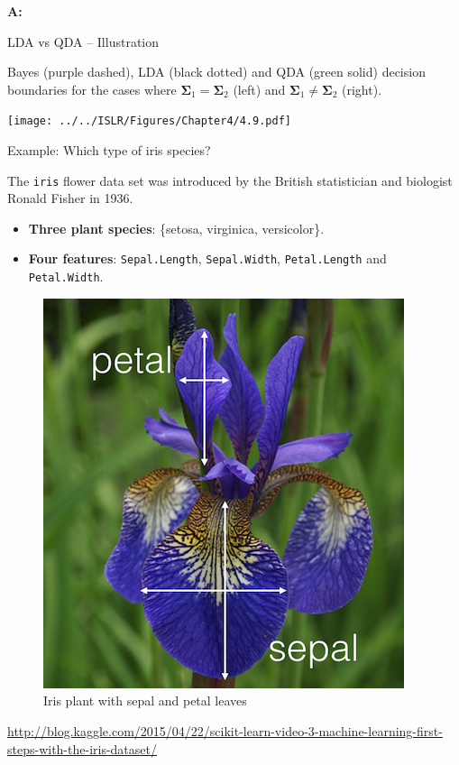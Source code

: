 \documentclass[
  10pt,
  ignorenonframetext,
]{beamer}
\providecommand{\tightlist}{%
  \setlength{\itemsep}{0pt}\setlength{\parskip}{0pt}}
\begin{document}
\begin{frame}
\textbf{A:}
\end{frame}

\begin{frame}
\begin{block}{LDA vs QDA -- Illustration}
\protect\hypertarget{lda-vs-qda-illustration}{}
\vspace{1mm}

Bayes (purple dashed), LDA (black dotted) and QDA (green solid) decision
boundaries for the cases where
\(\boldsymbol{\Sigma}_1 = \boldsymbol{\Sigma}_2\) (left) and
\(\boldsymbol{\Sigma}_1 \neq \boldsymbol{\Sigma}_2\) (right).

\centering

\texttt{[image: ../../ISLR/Figures/Chapter4/4.9.pdf]}
\end{block}
\end{frame}

\begin{frame}[fragile]
\begin{block}{Example: Which type of iris species?}
\protect\hypertarget{example-which-type-of-iris-species}{}
\(~\)

The \texttt{iris} flower data set was introduced by the British
statistician and biologist Ronald Fisher in 1936.

\vspace{2mm}

\begin{itemize}
\tightlist
\item
  \textbf{Three plant species}: \{setosa, virginica, versicolor\}.
\item
  \textbf{Four features}: \texttt{Sepal.Length}, \texttt{Sepal.Width},
  \texttt{Petal.Length} and \texttt{Petal.Width}.
\end{itemize}

\begin{figure}
\includegraphics[width=0.3\linewidth]{iris} \caption{Iris plant with sepal and petal leaves}\label{fig:iris_pic}
\end{figure}
\vspace{-2mm}
\tiny

\url{http://blog.kaggle.com/2015/04/22/scikit-learn-video-3-machine-learning-first-steps-with-the-iris-dataset/}
\end{block}
\end{frame}
\end{document}
